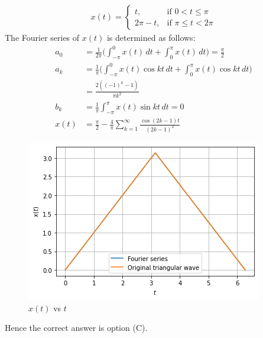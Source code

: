 \begin{enumerate}
\begin{align}
x(t)=  
\begin{cases}
t, & \text{if } 0 < t \leq \pi\\
2\pi-t, & \text{if } \pi \leq  t <  2\pi \nonumber
\end{cases}
\end{align}
The Fourier series of $x(t)$ is determined as follows:
\begin{align}
a_{0} &=\frac{1}{2\pi}\Bigg({\int_{-\pi}^{0}x(t)\, dt}+{\int_{0}^{\pi}x(t)\, dt}\Bigg)= \frac{\pi}{2} \nonumber \\
a_{k} &= \frac{1}{\pi}\Bigg({\int_{-\pi}^{0}x(t)\cos{kt}\, dt}+{\int_{0}^{\pi}x(t)\cos{kt}\, dt}\Bigg) \nonumber \\
&= \frac{2((-1)^{k}-1)}{\pi k^{2}}\nonumber \\
b_{k} &= \frac{1}{\pi}{\int_{-\pi}^{\pi}x(t)\sin{kt}\, dt} = 0\nonumber \\
x(t) &= \frac{\pi}{2}-\frac{4}{\pi}\sum_{k=1}^{\infty}\frac{\cos{(2k-1)t}}{(2k-1)^{2}}
\end{align}
\end{enumerate}
\begin{figure}[!ht]
    \centering
    \includegraphics[width=\columnwidth] {solutions/ec/1998/1/4/Figures/Gate_Assignment_4_Fig_4.png}
    \caption{$x(t)$ vs $t$}
    \label{ec/1998/1/4/Fourier series of x(t)}
\end{figure}
Hence the correct answer is option (C).
